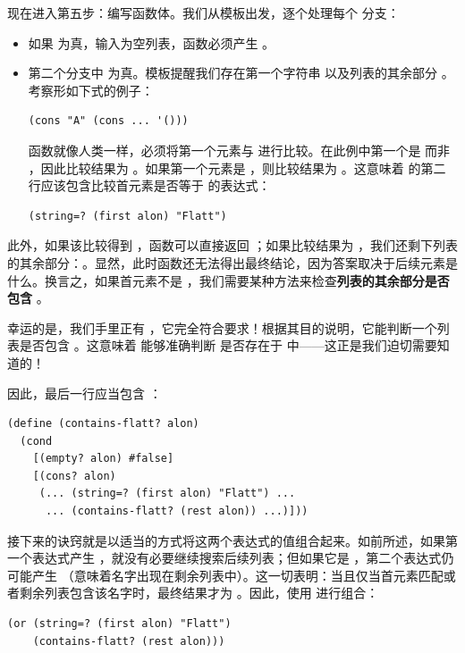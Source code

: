 现在进入第五步：编写函数体。我们从模板出发，逐个处理每个  分支：
\begin{itemize}
  \item 如果  为真，输入为空列表，函数必须产生 。
  \item 第二个分支中  为真。模板提醒我们存在第一个字符串  以及列表的其余部分 。考察形如下式的例子：
\begin{lstlisting}[language=BSL]
(cons "A" (cons ... '()))
\end{lstlisting}
  函数就像人类一样，必须将第一个元素与  进行比较。在此例中第一个是  而非 ，因此比较结果为 。如果第一个元素是 ，则比较结果为 。这意味着  的第二行应该包含比较首元素是否等于  的表达式：
\begin{lstlisting}[language=BSL]
(string=? (first alon) "Flatt")
\end{lstlisting}
\end{itemize}

此外，如果该比较得到 ，函数可以直接返回 ；如果比较结果为 ，我们还剩下列表的其余部分：。显然，此时函数还无法得出最终结论，因为答案取决于后续元素是什么。换言之，如果首元素不是 ，我们需要某种方法来检查\textbf{列表的其余部分是否包含 }。

幸运的是，我们手里正有 ，它完全符合要求！根据其目的说明，它能判断一个列表是否包含 。这意味着  能够准确判断  是否存在于  中——这正是我们迫切需要知道的！

因此，最后一行应当包含 ：
\begin{lstlisting}[language=BSL]
(define (contains-flatt? alon)
  (cond
    [(empty? alon) #false]
    [(cons? alon)
     (... (string=? (first alon) "Flatt") ...
      ... (contains-flatt? (rest alon)) ...)]))
\end{lstlisting}

接下来的诀窍就是以适当的方式将这两个表达式的值组合起来。如前所述，如果第一个表达式产生 ，就没有必要继续搜索后续列表；但如果它是 ，第二个表达式仍可能产生 （意味着名字出现在剩余列表中）。这一切表明：当且仅当首元素匹配或者剩余列表包含该名字时，最终结果才为 。因此，使用  进行组合：
\begin{lstlisting}[language=BSL]
(or (string=? (first alon) "Flatt")
    (contains-flatt? (rest alon)))
\end{lstlisting}

